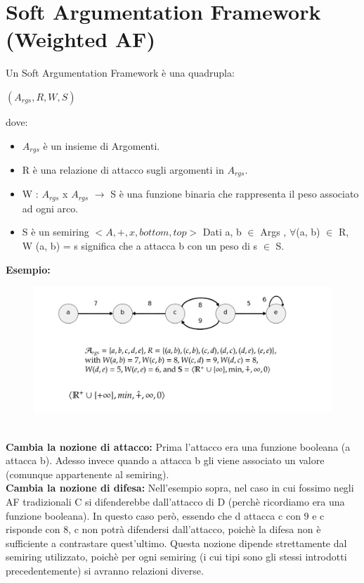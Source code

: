 \section{Soft Argumentation Framework (Weighted AF)}
Un Soft Argumentation Framework è una quadrupla:
\begin{center}
    $(A_{rgs} , R, W, S)$
\end{center}
dove:
\begin{itemize}
    \item $A_{rgs}$ è un insieme di Argomenti.
    \item R è una relazione di attacco sugli argomenti in $A_{rgs}$.
    \item W : $A_{rgs}$ x $A_{rgs}$ $\rightarrow$ S è una funzione binaria che rappresenta il peso associato ad ogni arco.
    \item S è un semiring $< A, +, x, bottom, top >$ Dati a, b $\in$ Args , $\forall$(a, b) $\in$ R, W (a, b) = s significa che a attacca b con un peso di s $\in$ S.
\end{itemize}
\newpage
\textbf{ Esempio:}
\begin{figure}[htp]
	\centering
    \includegraphics[width=14cm, keepaspectratio]{latex/img/Cap6/SoftA2.png}
\end{figure}
\\\textbf{Cambia la nozione di attacco:} Prima l’attacco era una funzione booleana (a attacca b). Adesso invece quando a attacca b gli viene associato un valore (comunque appartenente al semiring).
\\\textbf{Cambia la nozione di difesa:} Nell’esempio sopra, nel caso in cui fossimo negli AF tradizionali C si difenderebbe dall’attacco di D (perchè ricordiamo era una funzione booleana). In questo caso però, essendo che d attacca c con 9 e c risponde con 8, c non potrà difendersi dall’attacco, poichè la difesa non è sufficiente a contrastare quest’ultimo. Questa nozione dipende strettamente dal semiring utilizzato, poichè per ogni semiring (i cui tipi sono gli stessi introdotti precedentemente) si avranno relazioni diverse.
